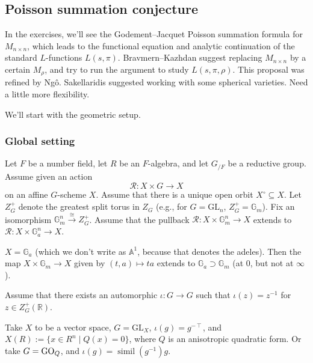 \documentclass[reqno]{amsart} 
\numberwithin{theorem}{section}
\numberwithin{equation}{section}
\numberwithin{exercise}{section}
\begin{document}
\subsection{Poisson summation conjecture}\label{sec:cq6tho1zlh}

In the exercises, we'll see the Godement--Jacquet Poisson summation formula for $M_{n \times n}$, which leads to the functional equation and analytic continuation of the standard $L$-functions $L(s, \pi)$.  Bravmern--Kazhdan suggest replacing $M_{n \times n}$ by a certain $M_{\rho}$, and try to run the argument to study $L(s, \pi, \rho)$.  This proposal was refined by Ngô.  Sakellaridis suggested working with some spherical
varieties.  Need a little more flexibility.

We'll start with the geometric setup.

\subsubsection{Global setting}\label{sec:cq6tho17py}

Let $F$ be a number field, let $R$ be an $F$-algebra, and let $G_{/F}$ be a reductive group.  Assume given an action
\begin{equation*}
  \mathcal{R} : X \times G \rightarrow X
\end{equation*}
on an affine $G$-scheme $X$.  Assume that there is a unique open orbit $X^{\circ} \subseteq X$.  Let $Z_G^+$ denote the greatest split torus in $Z_G$ (e.g., for $G = \mathrm{GL}_n$, $Z_G^+ = \mathbb{G}_m$).  Fix an isomorphism $\mathbb{G}_m^n \xrightarrow{\cong} Z_G^+$.  Assume that the pullback $\mathcal{R} : X \times \mathbb{G}_m^n \rightarrow X$ extends to $\mathcal{R} : X \times \mathbb{G}_a^n \rightarrow X$.

\begin{example}\label{example:cq6tho7qex}
  $X = \mathbb{G}_a$ (which we don't write as $\mathbb{A}^1$, because that denotes the adeles).  Then the map $X \times \mathbb{G}_m \rightarrow X$ given by $(t, a) \mapsto t a$ extends to $\mathbb{G}_a \supset \mathbb{G}_m$ (at $0$, but not at $\infty$).
\end{example}

Assume that there exists an automorphic $\iota : G \rightarrow G$ such that $\iota(z) = z^{-1}$ for $z \in Z_G^+(\mathbb{R})$.

\begin{example}\label{example:cq6tho7ox2}
  Take $X$ to be a vector space, $G =\mathrm{GL}_{X}$, $\iota(g) = g^{- \intercal}$, and $X(R) := \{x \in R^n \mid Q(x) = 0\}$, where $Q$ is an anisotropic quadratic form.  Or take $G = \operatorname{GO}_Q$, and $\iota(g) = \operatorname{simil}(g^{-1}) g$.
\end{example}
\end{document}
